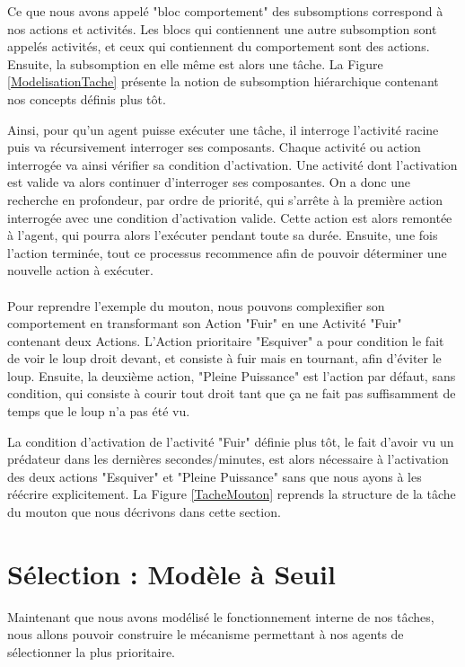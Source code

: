 			Ce que nous avons appelé "bloc comportement" des subsomptions correspond à nos actions et activités. Les blocs qui contiennent une autre subsomption sont appelés activités, et ceux qui contiennent du comportement sont des actions. Ensuite, la subsomption en elle même est alors une tâche. La Figure \ref{ModelisationTache} présente la notion de subsomption hiérarchique contenant nos concepts définis plus tôt.
			
			Ainsi, pour qu'un agent puisse exécuter une tâche, il interroge l'activité racine puis va récursivement interroger ses composants. Chaque activité ou action interrogée va ainsi vérifier sa condition d'activation. Une activité dont l'activation est valide va alors continuer d'interroger ses composantes. On a donc une recherche en profondeur, par ordre de priorité, qui s'arrête à la première action interrogée avec une condition d'activation valide. Cette action est alors remontée à l'agent, qui pourra alors l'exécuter pendant toute sa durée. Ensuite, une fois l'action terminée, tout ce processus recommence afin de pouvoir déterminer une nouvelle action à exécuter.
			
			\paragraph{}
			Pour reprendre l'exemple du mouton, nous pouvons complexifier son comportement en transformant son Action "Fuir" en une Activité "Fuir" contenant deux Actions. L'Action prioritaire "Esquiver" a pour condition le fait de voir le loup droit devant, et consiste à fuir mais en tournant, afin d'éviter le loup. Ensuite, la deuxième action, "Pleine Puissance" est l'action par défaut, sans condition, qui consiste à courir tout droit tant que ça ne fait pas suffisamment de temps que le loup n'a pas été vu.
			
			La condition d'activation de l'activité "Fuir" définie plus tôt, le fait d'avoir vu un prédateur dans les dernières secondes/minutes, est alors nécessaire à l'activation des deux actions "Esquiver" et "Pleine Puissance" sans que nous ayons à les réécrire explicitement. La Figure \ref{TacheMouton} reprends la structure de la tâche du mouton que nous décrivons dans cette section.
			
	
			
	\section{Sélection : Modèle à Seuil}
		Maintenant que nous avons modélisé le fonctionnement interne de nos tâches, nous allons pouvoir construire le mécanisme permettant à nos agents de sélectionner la plus prioritaire.
		
